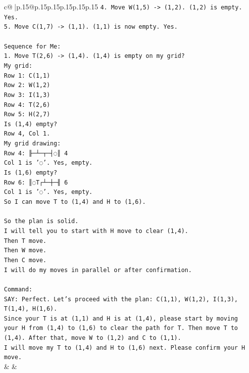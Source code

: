 \documentclass{article}
\begin{document}
{\begin{supertabular}{c@{$\;$}|p{.15\linewidth}@{}p{.15\linewidth}p{.15\linewidth}p{.15\linewidth}p{.15\linewidth}p{.15\linewidth}}
{{{\texttt{4. Move W(1,5) {-}> (1,2). (1,2) is empty. Yes.} \\
\texttt{5. Move C(1,7) {-}> (1,1). (1,1) is now empty. Yes.} \\
\\ 
\texttt{Sequence for Me:} \\
\texttt{1. Move T(2,6) {-}> (1,4). (1,4) is empty on my grid?} \\
\texttt{My grid:} \\
\texttt{Row 1: C(1,1)} \\
\texttt{Row 2: W(1,2)} \\
\texttt{Row 3: I(1,3)} \\
\texttt{Row 4: T(2,6)} \\
\texttt{Row 5: H(2,7)} \\
\texttt{Is (1,4) empty?} \\
\texttt{Row 4, Col 1.} \\
\texttt{My grid drawing:} \\
\texttt{Row 4: ╟─┴─┬─┤◌║ 4} \\
\texttt{Col 1 is '◌'. Yes, empty.} \\
\texttt{Is (1,6) empty?} \\
\texttt{Row 6: ║◌T┌┴─┼─╢ 6} \\
\texttt{Col 1 is '◌'. Yes, empty.} \\
\texttt{So I can move T to (1,4) and H to (1,6).} \\
\\ 
\texttt{So the plan is solid.} \\
\texttt{I will tell you to start with H move to clear (1,4).} \\
\texttt{Then T move.} \\
\texttt{Then W move.} \\
\texttt{Then C move.} \\
\texttt{I will do my moves in parallel or after confirmation.} \\
\\ 
\texttt{Command:} \\
\texttt{SAY: Perfect. Let's proceed with the plan: C(1,1), W(1,2), I(1,3), T(1,4), H(1,6).} \\
\texttt{Since your T is at (1,1) and H is at (1,4), please start by moving your H from (1,4) to (1,6) to clear the path for T. Then move T to (1,4). After that, move W to (1,2) and C to (1,1).} \\
\texttt{I will move my T to (1,4) and H to (1,6) next. Please confirm your H move.} \\
            }
        }
    }
    & & \\ \\


\end{supertabular}}
\end{document}
